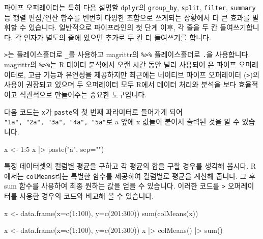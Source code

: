 \documentclass[
  a4paper,
]{book}
\newenvironment{Shaded}{\begin{snugshade}}{\end{snugshade}}
\newcommand{\AttributeTok}[1]{\textcolor[rgb]{0.40,0.45,0.13}{#1}}
\newcommand{\DecValTok}[1]{\textcolor[rgb]{0.68,0.00,0.00}{#1}}
\newcommand{\FunctionTok}[1]{\textcolor[rgb]{0.28,0.35,0.67}{#1}}
\newcommand{\NormalTok}[1]{\textcolor[rgb]{0.00,0.23,0.31}{#1}}
\newcommand{\OtherTok}[1]{\textcolor[rgb]{0.00,0.23,0.31}{#1}}
\newcommand{\SpecialCharTok}[1]{\textcolor[rgb]{0.37,0.37,0.37}{#1}}
\newcommand{\StringTok}[1]{\textcolor[rgb]{0.13,0.47,0.30}{#1}}
\begin{document}
파이프 오퍼레이터는 특히 다음 설명할 \texttt{dplyr}의
\texttt{group\_by}, \texttt{split}, \texttt{filter}, \texttt{summary} 등
행렬 편집/연산 함수를 빈번히 다양한 조합으로 쓰게되는 상황에서 더 큰
효과를 발휘할 수 있습니다. 일반적으로 파이프라인의 첫 단계 이후, 각 줄을
두 칸 들여쓰기합니다. 각 인자가 별도의 줄에 있으면 추가로 두 칸 더
들여쓰기를 합니다.

\texttt{\textbar{}\textgreater{}}는 플레이스홀더로 \texttt{\_}를
사용하고 magrittr의 \texttt{\%\textgreater{}\%} 플레이스홀더로
\texttt{.}을 사용합니다. magrittr의 \texttt{\%\textgreater{}\%}는 R
데이터 분석에서 오랜 시간 동안 널리 사용되어 온 파이프 오퍼레이터로,
고급 기능과 유연성을 제공하지만 최근에는 네이티브 파이프 오퍼레이터
(\texttt{\textbar{}\textgreater{}})의 사용이 권장되고 있으며 두
오퍼레이터 모두 R에서 데이터 처리와 분석을 보다 효율적이고 직관적으로
만들어주는 중요한 도구입니다.

다음 코드는 \texttt{x}가 \texttt{paste}의 첫 번째 파라미터로 들어가게
되어 \texttt{"1a",\ "2a",\ "3a",\ "4a",\ "5a"}로 a 앞에 x 값들이 붙어서
출력된 것을 알 수 있습니다.

\begin{Shaded}
\begin{Highlighting}[]
\NormalTok{x }\OtherTok{\textless{}{-}} \DecValTok{1}\SpecialCharTok{:}\DecValTok{5}
\NormalTok{x }\SpecialCharTok{|\textgreater{}} \FunctionTok{paste}\NormalTok{(}\StringTok{"a"}\NormalTok{, }\AttributeTok{sep=}\StringTok{""}\NormalTok{)}
\end{Highlighting}
\end{Shaded}

특정 데이터셋의 컬럼별 평균을 구하고 각 평균의 합을 구할 경우를 생각해
봅시다. R에서는 \texttt{colMeans}라는 특별한 함수를 제공하여 컬럼별로
평균을 계산해 줍니다. 그 후 sum 함수를 사용하여 최종 원하는 값을 얻을 수
있습니다. 이러한 코드를 \texttt{\textbar{}\textgreater{}} 오퍼레이터를
사용한 경우의 코드와 비교해 볼 수 있습니다.

\begin{Shaded}
\begin{Highlighting}[]
\NormalTok{x }\OtherTok{\textless{}{-}} \FunctionTok{data.frame}\NormalTok{(}\AttributeTok{x=}\FunctionTok{c}\NormalTok{(}\DecValTok{1}\SpecialCharTok{:}\DecValTok{100}\NormalTok{), }\AttributeTok{y=}\FunctionTok{c}\NormalTok{(}\DecValTok{201}\SpecialCharTok{:}\DecValTok{300}\NormalTok{))}
\FunctionTok{sum}\NormalTok{(}\FunctionTok{colMeans}\NormalTok{(x))}

\NormalTok{x }\OtherTok{\textless{}{-}} \FunctionTok{data.frame}\NormalTok{(}\AttributeTok{x=}\FunctionTok{c}\NormalTok{(}\DecValTok{1}\SpecialCharTok{:}\DecValTok{100}\NormalTok{), }\AttributeTok{y=}\FunctionTok{c}\NormalTok{(}\DecValTok{201}\SpecialCharTok{:}\DecValTok{300}\NormalTok{))}
\NormalTok{x }\SpecialCharTok{|\textgreater{}} 
  \FunctionTok{colMeans}\NormalTok{() }\SpecialCharTok{|\textgreater{}} 
  \FunctionTok{sum}\NormalTok{()}
\end{Highlighting}
\end{Shaded}
\end{document}

